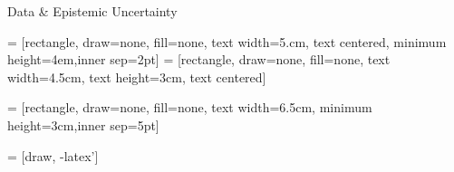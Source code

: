 \documentclass[lecture]{beamer}
\newcommand{\vect}[1]{\ensuremath{\boldsymbol{\mathrm{#1}}}}
\begin{document}
\begin{frame}{\normalsize Data \& Epistemic Uncertainty}
\footnotesize
\vspace{-.5cm}

 = [rectangle, draw=none, fill=none,  text width=5.cm, text centered, minimum height=4em,inner sep=2pt]
 = [rectangle, draw=none, fill=none,  text width=4.5cm,  text height=3cm,  text centered]

 = [rectangle, draw=none, fill=none,  text width=6.5cm, minimum height=3cm,inner sep=5pt]


 = [draw, -latex']


\end{frame}
\end{document}
